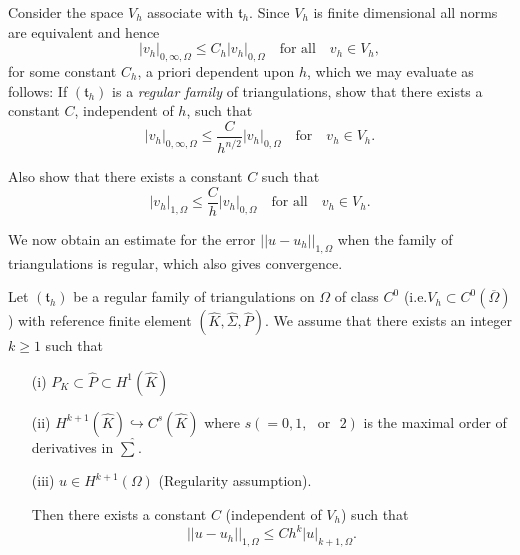 \begin{exercise}\label{chap7-exer7.2}
Consider the space $V_{h}$ associate with $\mathfrak{t}_{h}$. Since
$V_{h}$ is finite dimensional all norms are equivalent and hence
$$
|v_{h}|_{0,\infty,\Omega}\leq C_{h}|v_{h}|_{0,\Omega}\quad\text{for
  all}\quad v_{h}\in V_{h},
$$
for some constant $C_{h}$, a priori dependent upon $h$, which we may
evaluate as follows: If $(\mathfrak{t}_{h})$ is a {\em regular family}
of triangulations, show that there exists a constant $C$, independent
of $h$, such that
\begin{equation*}
|v_{h}|_{0,\infty,\Omega}\leq
\frac{C} {h^{n/2}}|v_{h}|_{0,\Omega}\quad\text{for}\quad v_{h}\in
V_{h}.\tag{7.3}\label{chap7-eq7.3} 
\end{equation*}

Also show that there exists a constant $C$ such that
\begin{equation*}
|v_{h}|_{1,\Omega}\leq \frac{C}{h}|v_{h}|_{0,\Omega}\quad\text{for
  all}\quad v_{h}\in V_{h}.\tag{7.4}\label{7.4}
\end{equation*}
\end{exercise}

We now obtain an estimate for the error $||u-u_{h}||_{1,\Omega}$ when
the family of triangulations is regular, which also gives convergence.

\begin{theorem}\label{chap7-thm7.1}
Let $(\mathfrak{t}_{h})$ be a regular family of triangulations on
$\Omega$ of class $C^{0}$ (i.e.\@ $V_{h}\subset
C^{0}(\overline{\Omega})$) with reference finite element
$(\hat{K},\hat{\Sigma},\hat{P})$. We assume that there exists an
integer $k\geq 1$ such that
\begin{itemize}
\item[\rm(i)] $P_{K}\subset\hat{P}\subset H^{1}(\hat{K})$

\item[\rm(ii)] $H^{k+1}(\hat{K})\hookrightarrow C^{s}(\hat{K})$ where
  $s(=0,1,\text{~ or~ }2)$ is the maximal order of derivatives in
  $\hat{\sum}$. 

\item[\rm(iii)] $u\in H^{k+1}(\Omega)$ (Regularity assumption).

Then there exists a constant $C$ (independent of $V_{h}$) such that
\begin{equation*}
||u-u_{h}||_{1,\Omega}\leq
Ch^{k}|u|_{k+1,\Omega}.\tag{7.5}\label{chap7-eq7.5} 
\end{equation*}
\end{itemize}
\end{theorem}

